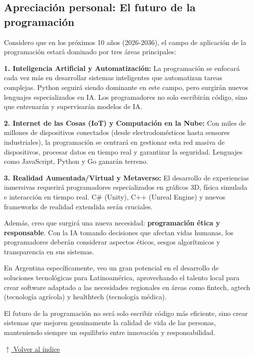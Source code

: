 \documentclass[12pt]{article}
\newcommand{\volverindice}{%
    \vspace{1em}%
    \begin{flushright}%
        \hyperlink{indice}{\small $\uparrow$ Volver al índice}%
    \end{flushright}%
}
\begin{document}
\subsection{Apreciación personal: El futuro de la programación}

Considero que en los próximos 10 años (2026-2036), el campo de aplicación de la programación estará dominado por tres áreas principales:

\textbf{1. Inteligencia Artificial y Automatización:} La programación se enfocará cada vez más en desarrollar sistemas inteligentes que automatizan tareas complejas. Python seguirá siendo dominante en este campo, pero surgirán nuevos lenguajes especializados en IA. Los programadores no solo escribirán código, sino que entrenarán y supervisarán modelos de IA.

\textbf{2. Internet de las Cosas (IoT) y Computación en la Nube:} Con miles de millones de dispositivos conectados (desde electrodomésticos hasta sensores industriales), la programación se centrará en gestionar esta red masiva de dispositivos, procesar datos en tiempo real y garantizar la seguridad. Lenguajes como JavaScript, Python y Go ganarán terreno.

\textbf{3. Realidad Aumentada/Virtual y Metaverso:} El desarrollo de experiencias inmersivas requerirá programadores especializados en gráficos 3D, física simulada e interacción en tiempo real. C\# (Unity), C++ (Unreal Engine) y nuevos frameworks de realidad extendida serán cruciales.

Además, creo que surgirá una nueva necesidad: \textbf{programación ética y responsable}. Con la IA tomando decisiones que afectan vidas humanas, los programadores deberán considerar aspectos éticos, sesgos algorítmicos y transparencia en sus sistemas.

En Argentina específicamente, veo un gran potencial en el desarrollo de soluciones tecnológicas para Latinoamérica, aprovechando el talento local para crear software adaptado a las necesidades regionales en áreas como fintech, agtech (tecnología agrícola) y healthtech (tecnología médica).

El futuro de la programación no será solo escribir código más eficiente, sino crear sistemas que mejoren genuinamente la calidad de vida de las personas, manteniendo siempre un equilibrio entre innovación y responsabilidad.

\volverindice
\newpage

\end{document}
